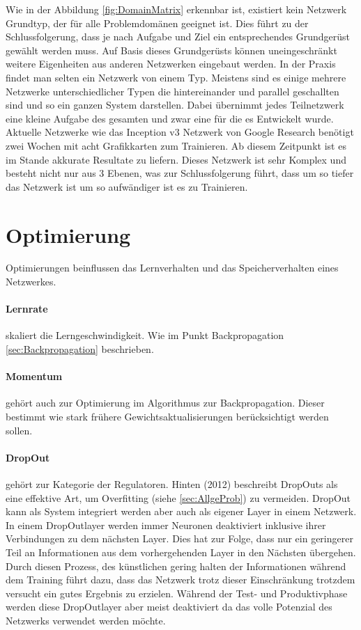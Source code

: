 Wie in der Abbildung \ref{fig:DomainMatrix} erkennbar ist, existiert kein Netzwerk Grundtyp, der für alle Problemdomänen geeignet ist.
Dies führt zu der Schlussfolgerung, dass je nach Aufgabe und Ziel ein entsprechendes Grundgerüst gewählt werden muss. 
Auf Basis dieses Grundgerüsts können uneingeschränkt weitere Eigenheiten aus anderen Netzwerken eingebaut werden.
In der Praxis findet man selten ein Netzwerk von einem Typ.
Meistens sind es einige mehrere Netzwerke unterschiedlicher Typen die hintereinander und parallel geschallten sind und so ein ganzen System darstellen.
Dabei übernimmt jedes Teilnetzwerk eine kleine Aufgabe des gesamten und zwar eine für die es Entwickelt wurde.
Aktuelle Netzwerke wie das Inception v3 Netzwerk von Google Research benötigt zwei Wochen mit acht Grafikkarten zum Trainieren. 
Ab diesem Zeitpunkt ist es im Stande akkurate Resultate zu liefern. 
Dieses Netzwerk ist sehr Komplex und besteht nicht nur aus 3 Ebenen, was zur Schlussfolgerung führt, dass um so tiefer das Netzwerk ist um so aufwändiger ist es zu Trainieren.

\section{Optimierung}

Optimierungen beinflussen das Lernverhalten und das Speicherverhalten eines Netzwerkes.

\paragraph{Lernrate} skaliert die Lerngeschwindigkeit. 
Wie im Punkt Backpropagation \ref{sec:Backpropagation} beschrieben.

\paragraph{Momentum} gehört auch zur Optimierung im Algorithmus zur Backpropagation.
Dieser bestimmt wie stark frühere Gewichtsaktualisierungen berücksichtigt werden sollen. 

\paragraph{DropOut} gehört zur Kategorie der Regulatoren. 
Hinten (2012) beschreibt DropOuts als eine effektive Art, um Overfitting (siehe \ref{sec:AllgeProb}) zu vermeiden.
DropOut kann als System integriert werden aber auch als eigener Layer in einem Netzwerk.
In einem DropOutlayer werden immer Neuronen deaktiviert inklusive ihrer Verbindungen zu dem nächsten Layer.
Dies hat zur Folge, dass nur ein geringerer Teil an Informationen aus dem vorhergehenden Layer in den Nächsten übergehen. 
Durch diesen Prozess, des künstlichen gering halten der Informationen während dem Training führt dazu, dass das Netzwerk trotz dieser Einschränkung trotzdem versucht ein gutes Ergebnis zu erzielen. 
Während der Test- und Produktivphase werden diese DropOutlayer aber meist deaktiviert da das volle Potenzial des Netzwerks verwendet werden möchte.

